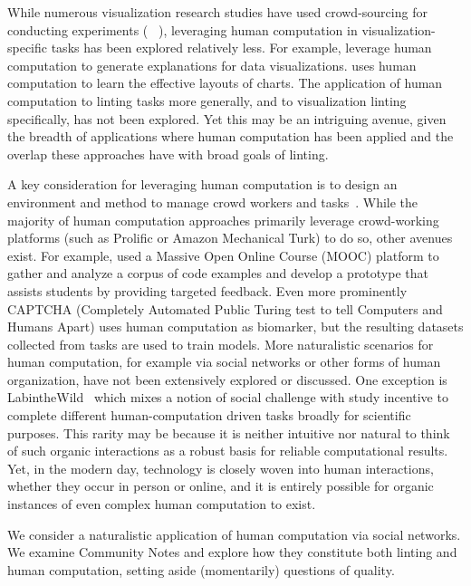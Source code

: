 While numerous visualization research studies have used crowd-sourcing for conducting experiments (\eg{} ~\cite{Heer:GraphicalPercention:2010,Borgo:Crowdsourcing:2018}), leveraging human computation in visualization-specific tasks has been explored relatively less.
For example, \citet{Willet:VisExplain:2012} leverage human computation to generate explanations for data visualizations. \citet{Wu:Layouts:2021} uses human computation to learn the effective layouts of charts. The application of human computation to linting tasks more generally, and to visualization linting specifically, has not been explored. Yet this may be an intriguing avenue, given the breadth of applications where human computation has been applied and the overlap these approaches have with broad goals of linting.

A key consideration for leveraging human computation is to design an environment and method to manage crowd workers and tasks~\cite{Allahbakhsh:CrowdIssues:2013}. While the majority of human computation approaches primarily leverage crowd-working platforms (such as Prolific or Amazon Mechanical Turk) to do so, other avenues exist.
For example, \citet{Moghadam:AutoStyle:2015} used a Massive Open Online Course (MOOC) platform to gather and analyze a corpus of code examples and develop a prototype that assists students by providing targeted feedback.
Even more prominently~\cite{ResearchMethodsHCI_Chapter14} CAPTCHA (Completely Automated Public Turing test to tell Computers and Humans Apart) uses human computation as biomarker, but the resulting datasets collected from tasks are used to train models.
More naturalistic scenarios for human computation, for example via social networks or other forms of human organization, have not been extensively explored or discussed.
One exception is LabintheWild~\cite{reinecke2015labinthewild} which mixes a notion of social challenge with study incentive to complete different human-computation driven tasks broadly for scientific purposes.
This rarity may be because it is neither intuitive nor natural to think of such organic interactions as a robust basis for reliable computational results. Yet, in the modern day, technology is closely woven into human interactions, whether they occur in person or online, and it is entirely possible for organic instances of even complex human computation to exist.

We consider a naturalistic application of human computation via social networks. We examine Community Notes and explore how they constitute both linting and human computation, setting aside (momentarily) questions of quality.











